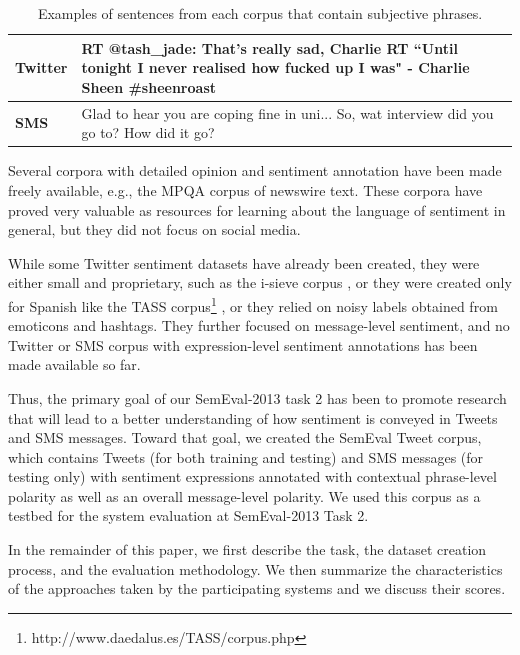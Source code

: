  \begin{table}[t]
\small
\begin{tabular}{|l|p{14cm}|}
\hline
\bf Twitter & RT @tash\_jade: That's really sad, Charlie RT ``Until tonight I never realised how fucked up I was" - Charlie Sheen \#sheenroast  \\
\hline
\bf SMS & Glad to hear you are coping fine in uni... So, wat interview did you go to? How did it go?\\
 \hline
 \end{tabular}
\caption{Examples of sentences from each corpus that contain subjective phrases.}
\label{T:Sentences}
\end{table}

Several corpora with detailed opinion and sentiment annotation have been made freely available, e.g., the MPQA corpus \cite{Wiebe05} of newswire text.
These corpora have proved very valuable as resources for learning about the language of sentiment in general,
but they did not focus on social media.

While some Twitter sentiment datasets have already been created,
they were either small and proprietary, such as the i-sieve corpus \cite{Kouloumpis11}, or they were created only for Spanish
like the TASS corpus\footnote{http://www.daedalus.es/TASS/corpus.php} \cite{TASS},
or they relied on noisy labels obtained from emoticons and hashtags.
They further focused on message-level sentiment,
and no Twitter or SMS corpus with expression-level sentiment annotations has been made available so far.

Thus, the primary goal of our SemEval-2013 task 2 has been to promote research
that will lead to a better understanding of how sentiment is conveyed in Tweets and SMS messages.
Toward that goal, we created the SemEval Tweet corpus,
which contains Tweets (for both training and testing) and SMS messages (for testing only) with sentiment expressions
annotated with contextual phrase-level polarity as well as an overall message-level polarity.
We used this corpus as a testbed for the system evaluation at SemEval-2013 Task 2.

In the remainder of this paper, we first describe the task, the dataset creation process, and the evaluation methodology.
We then summarize the characteristics of the approaches taken by the participating systems and we discuss their scores.
